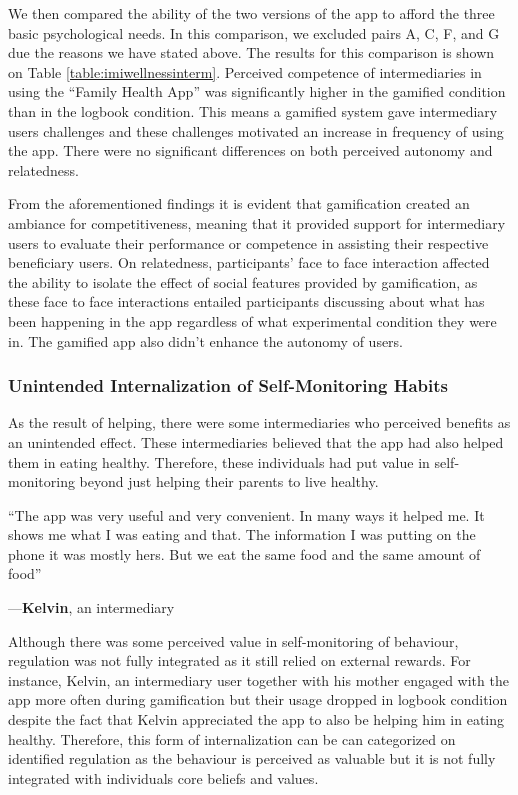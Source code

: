 \documentclass{sig-alternate}
\newenvironment{myquote}
               {\list{}{\rightmargin   \leftmargin
                        \parsep        0in }%
                \item\relax}
               {\endlist}
\newcommand{\userquote}[2]{\begin{samepage}\begin{myquote} 
     \em{\small{#2\begin{flushright}---#1\end{flushright}}}
   \end{myquote}\end{samepage}}
\begin{document}
We then compared the ability of the two versions of the app to afford the three basic psychological needs. In this comparison, we excluded pairs A, C, F, and G due the reasons we have stated above. The results for this comparison is shown on Table \ref{table:imiwellnessinterm}. Perceived competence of intermediaries in using the ``Family Health App'' was significantly higher in the gamified condition than in the logbook condition. This means a gamified system gave intermediary users challenges and these challenges motivated an increase in frequency of using the app. There were no significant differences on both perceived autonomy and relatedness. 

From the aforementioned findings it is evident that gamification created an ambiance for competitiveness, meaning that it provided support for intermediary users to evaluate their performance or competence in assisting their respective beneficiary users. On relatedness, participants' face to face interaction affected the ability to isolate the effect of social features provided by gamification, as these face to face interactions entailed participants discussing about what has been happening in the app regardless of what experimental condition they were in. The gamified app also didn't enhance the autonomy of users.
\subsubsection{Unintended Internalization of Self-Monitoring Habits}
As the result of helping, there were some intermediaries who perceived benefits as an unintended effect. These intermediaries believed that the app had also helped them in eating healthy. Therefore, these individuals had put value in self-monitoring beyond just helping their parents to live healthy. 

\userquote{\textbf{Kelvin}, an intermediary} {``The app was very useful and very convenient. In many ways it helped me.  It shows me what I was eating and that. The information I was putting on the phone it was mostly hers. But we eat the same food and the same amount of food''} 

Although there was some perceived value in self-monitoring of behaviour, regulation was not fully integrated as it still relied on external rewards. For instance, Kelvin, an intermediary user together with his mother engaged with the app more often during gamification but their usage dropped in logbook condition despite the fact that Kelvin appreciated the app to also be helping him in eating healthy. Therefore, this form of internalization can be can categorized on identified regulation as the behaviour is perceived as valuable but it is not fully integrated with individuals core beliefs and values.
\end{document}
